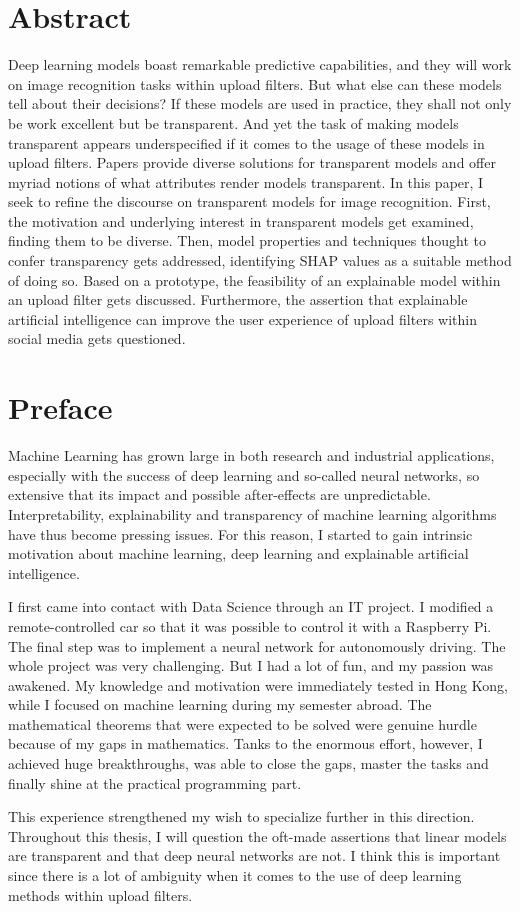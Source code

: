 
\section*{Abstract}
\label{sec:abstract}

Deep learning models boast remarkable predictive capabilities, and they will work on image recognition tasks within upload filters. But what else can these models tell about their decisions? If these models are used in practice, they shall not only be work excellent but be transparent. And yet the task of making models transparent appears underspecified if it comes to the usage of these models in upload filters. Papers provide diverse solutions for transparent models and offer myriad notions of what attributes render models transparent. In this paper, I seek to refine the discourse on transparent models for image recognition. First, the motivation and underlying interest in transparent models get examined, finding them to be diverse. Then, model properties and techniques thought to confer transparency gets addressed, identifying SHAP values as a suitable method of doing so. Based on a prototype, the feasibility of an explainable model within an upload filter gets discussed. Furthermore, the assertion that explainable artificial intelligence can improve the user experience of upload filters within social media gets questioned. 

\section*{Preface}
Machine Learning has grown large in both research and industrial applications, especially with the success of deep learning and so-called neural networks, so extensive that its impact and possible after-effects are unpredictable. Interpretability, explainability and transparency of machine learning algorithms have thus become pressing issues. For this reason, I started to gain intrinsic motivation about machine learning, deep learning and explainable artificial intelligence. 

I first came into contact with Data Science through an IT project.  I modified a remote-controlled car so that it was possible to control it with a Raspberry Pi. The final step was to implement a neural network for autonomously driving. The whole project was very challenging. But I had a lot of fun, and my passion was awakened. My knowledge and motivation were immediately tested in Hong Kong, while I focused on machine learning during my semester abroad. The mathematical theorems that were expected to be solved were genuine hurdle because of my gaps in mathematics. Tanks to the enormous effort, however, I achieved huge breakthroughs, was able to close the gaps, master the tasks and finally shine at the practical programming part.

This experience strengthened my wish to specialize further in this direction. Throughout this thesis, I will question the oft-made assertions that linear models are transparent and that deep neural networks are not. I think this is important since there is a lot of ambiguity when it comes to the use of deep learning methods within upload filters. 